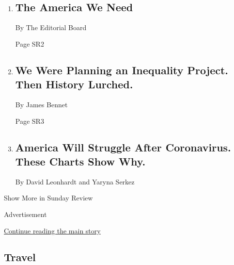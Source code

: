 \begin{enumerate}
\def\labelenumi{\arabic{enumi}.}
\item
  \href{/2020/04/09/opinion/sunday/coronavirus-inequality-america.html}{}

  \hypertarget{the-america-we-need}{%
  \subsection{The America We Need}\label{the-america-we-need}}

  By The Editorial Board

  Page SR2
\item
  \href{/2020/04/09/opinion/sunday/inequality-coronavirus.html}{}

  \hypertarget{we-were-planning-an-inequality-project-then-history-lurched}{%
  \subsection{We Were Planning an Inequality Project. Then History
  Lurched.}\label{we-were-planning-an-inequality-project-then-history-lurched}}

  By James Bennet

  Page SR3
\item
  \href{/interactive/2020/04/10/opinion/coronavirus-us-economy-inequality.html}{}

  \hypertarget{america-will-struggle-after-coronavirus-these-charts-show-why}{%
  \subsection{America Will Struggle After Coronavirus. These Charts Show
  Why.}\label{america-will-struggle-after-coronavirus-these-charts-show-why}}

  By David Leonhardt and Yaryna Serkez
\end{enumerate}

Show More in Sunday Review

Advertisement

\protect\hyperlink{after-mid5}{Continue reading the main story}

\hypertarget{travel}{%
\subsection{Travel}\label{travel}}

